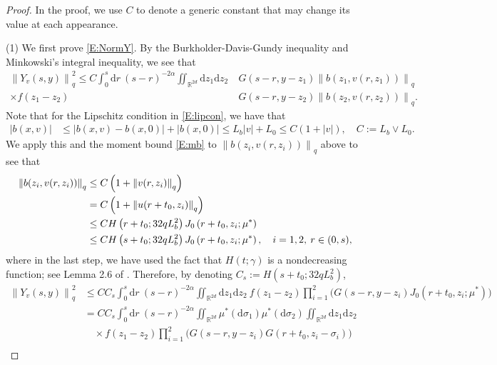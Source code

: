 \documentclass[12pt]{report}
\theoremstyle{plain}
\theoremstyle{definition}
\numberwithin{equation}{section}
\newcommand{\R}{\mathbb{R}}
\newcommand{\Norm}[1]{\left\|  #1   \right\|}
\newcommand{\ud}{\ensuremath{ \mathrm{d} }}
\begin{document}
\begin{proof}
	In the proof, we use $C$ to denote a generic constant that may change its value at each
	appearance. \bigskip
	
	\noindent (1) We first prove \eqref{E:NormY}. By the Burkholder-Davis-Gundy inequality and
	Minkowski's integral inequality, we see that
	\begin{align*}
	\Norm{Y_v(s,y)}_q^2 \le
	C \int_0^s \ud r \: (s-r)^{-2\alpha}
	\iint_{\R^{2d}} \ud z_1\ud z_2 \: & G(s-r,y-z_1) \Norm{b\left(z_1,v(r,z_1)\right)}_q \\
	\times f(z_1-z_2)                 & G(s-r,y-z_2) \Norm{b\left(z_2,v(r,z_2)\right)}_q.
	\end{align*}
	Note that for the Lipschitz condition in \eqref{E:lipcon}, we have that
	\begin{align*}
	\left|b\left(x,v\right)\right|
	& \le \left|b\left(x,v\right) - b\left(x,0\right)\right| + \left|b\left(x,0\right)\right|
	\le L_b |v| + L_0 \le C (1+|v|),\quad C:=L_b\vee L_0.
	\end{align*}
	We apply this and the moment bound \eqref{E:mb} to $\Norm{b(z_i, v(r,z_i))}_q$ above to see that
	\begin{align} \label{E:NormB}
	\Norm{b(z_i, v(r,z_i))}_q
	& \le C\left(1+\Norm{v(r,z_i)}_q\right)                               \notag \\
	& =   C\left(1+\Norm{u(r+t_0,z_i)}_q\right)                           \notag \\
	& \le C H\left(r+t_0;32qL_b^2\right) J_0\left(r + t_0,z_i;\mu^*\right)\notag \\
	& \le C H\left(s+t_0;32qL_b^2\right) J_0\left(r + t_0,z_i;\mu^*\right), \quad i=1,2, \: r\in(0,s),
	\end{align}
	where in the last step, we have used the fact that $H(t;\gamma)$ is a nondecreasing function; see
	Lemma 2.6 of \cite{chen.kim:19:nonlinear}. Therefore, by denoting
	$C_s:=H\left(s+t_0;32qL_b^2\right)$,
	\begin{align*}
	\Norm{Y_v(s,y)}_q^2
	& \le C C_s \int_0^s \ud r \: (s-r)^{-2\alpha} \iint_{\R^{2d}} \ud z_1\ud z_2\: f(z_1-z_2) \prod_{i=1}^2  \bigg( G(s-r,y-z_i)  J_0\left(r + t_0,z_i;\mu^*\right)\bigg)     \\
	& = C C_s \int_0^s \ud r \: (s-r)^{-2\alpha} \iint_{\R^{2d}} \mu^*(\ud \sigma_1) \mu^*(\ud \sigma_2) \iint_{\R^{2d}} \ud z_1\ud z_2                                        \\
	& \quad \times f(z_1-z_2) \prod_{i=1}^{2} \bigg( G(s-r,y-z_i)G(r + t_0,z_i-\sigma_i) \bigg)                                                                                \\

\end{align*}
\end{proof}
\end{document}
